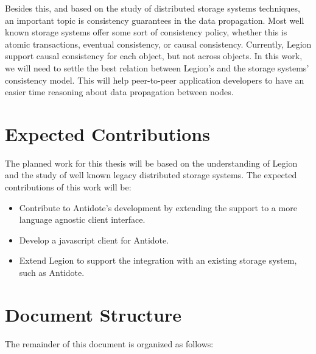 	Besides this, and based on the study of distributed storage systems techniques, an important topic is consistency guarantees in the data propagation. Most well known storage systems offer some sort of consistency policy, whether this is atomic transactions, eventual consistency, or causal consistency. Currently, Legion support causal consistency for each object, but not across objects. In this work, we will need to settle the best relation between Legion's and the storage systems' consistency model. This will help peer-to-peer application developers to have an easier time reasoning about data propagation between nodes.

\section{Expected Contributions}
\label{sec:expected_contributions}
The planned work for this thesis will be based on the understanding of Legion and the study of well known legacy distributed storage systems. The expected contributions of this work will be:
	
\begin{itemize}
\item Contribute to Antidote's development by extending the support to a more language agnostic client interface.

\item Develop a javascript client for Antidote.

\item Extend Legion to support the integration with an existing storage system, such as Antidote.

\end{itemize}

\section{Document Structure}
\label{document_structure}
The remainder of this document is organized as follows:\par

